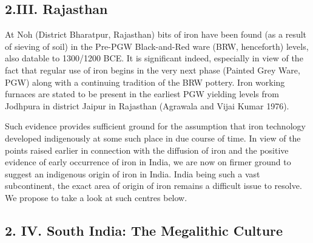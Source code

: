 \subsection*{2.III. Rajasthan}\label{subsection-6}

At Noh (District Bharatpur, Rajasthan) bits of iron have been found (as a result of sieving of soil) in the Pre-PGW Black-and-Red ware (BRW, henceforth) levels, also datable to 1300/1200 BCE. It is significant indeed, especially in view of the fact that regular use of iron begins in the very next phase (Painted Grey Ware, PGW) along with a continuing tradition of the BRW pottery. Iron working furnaces are stated to be present in the earliest PGW yielding levels from Jodhpura in district Jaipur in Rajasthan (Agrawala and Vijai Kumar 1976).

Such evidence provides sufficient ground for the assumption that iron technology developed indigenously at some such place in due course of time. In view of the points raised earlier in connection with the diffusion of iron and the positive evidence of early occurrence of iron in India, we are now on firmer ground to suggest an indigenous origin of iron in India. India being such a vast subcontinent, the exact area of origin of iron remains a difficult issue to resolve. We propose to take a look at such centres below.

\subsection*{2. IV. South India: The Megalithic Culture}\label{subsection-7}

